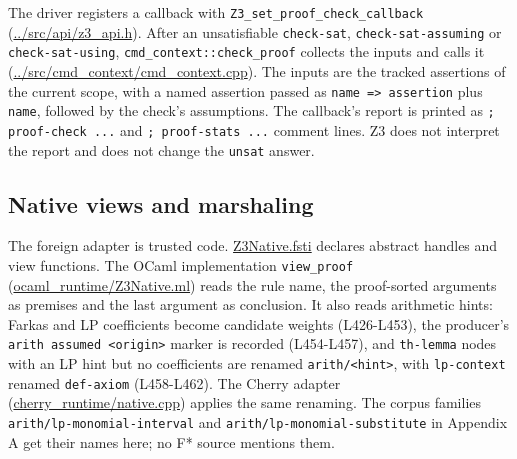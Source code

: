 \documentclass[10pt,a4paper]{article}
\begin{document}
The driver registers a callback with \texttt{Z3\_\allowbreak{}set\_\allowbreak{}proof\_\allowbreak{}check\_\allowbreak{}callback} (\href{https://github.com/Z3Prover/z3/blob/8fbb275aba0472e862e289c7af1331b3bd5d512c/src/api/z3_api.h\#L1735-L1761}{.\allowbreak{}.\allowbreak{}/\allowbreak{}src/\allowbreak{}api/\allowbreak{}z3\_\allowbreak{}api.\allowbreak{}h}). After an unsatisfiable \texttt{check-{}\allowbreak{}sat}, \texttt{check-{}\allowbreak{}sat-{}\allowbreak{}assuming} or \texttt{check-{}\allowbreak{}sat-{}\allowbreak{}using}, \texttt{cmd\_\allowbreak{}context:\allowbreak{}:\allowbreak{}check\_\allowbreak{}proof} collects the inputs and calls it (\href{https://github.com/Z3Prover/z3/blob/8fbb275aba0472e862e289c7af1331b3bd5d512c/src/cmd_context/cmd_context.cpp\#L2026-L2056}{.\allowbreak{}.\allowbreak{}/\allowbreak{}src/\allowbreak{}cmd\_\allowbreak{}context/\allowbreak{}cmd\_\allowbreak{}context.\allowbreak{}cpp}). The inputs are the tracked assertions of the current scope, with a named assertion passed as \texttt{name =\allowbreak{}> assertion} plus \texttt{name}, followed by the check's assumptions. The callback's report is printed as \texttt{; proof-{}\allowbreak{}check .\allowbreak{}.\allowbreak{}.\allowbreak{}} and \texttt{; proof-{}\allowbreak{}stats .\allowbreak{}.\allowbreak{}.\allowbreak{}} comment lines. Z3 does not interpret the report and does not change the \texttt{unsat} answer.

\subsection{Native views and marshaling}\label{sec:32-native-views-and-marshaling}

The foreign adapter is trusted code. \href{https://github.com/Z3Prover/z3/blob/8fbb275aba0472e862e289c7af1331b3bd5d512c/fstar/Z3Native.fsti}{Z3Native.\allowbreak{}fsti} declares abstract handles and view functions. The OCaml implementation \texttt{view\_\allowbreak{}proof} (\href{https://github.com/Z3Prover/z3/blob/8fbb275aba0472e862e289c7af1331b3bd5d512c/fstar/ocaml_runtime/Z3Native.ml\#L404-L501}{ocaml\_\allowbreak{}runtime/\allowbreak{}Z3Native.\allowbreak{}ml}) reads the rule name, the proof-sorted arguments as premises and the last argument as conclusion. It also reads arithmetic hints: Farkas and LP coefficients become candidate weights (L426-L453), the producer's \texttt{arith assumed <origin>} marker is recorded (L454-L457), and \texttt{th-{}\allowbreak{}lemma} nodes with an LP hint but no coefficients are renamed \texttt{arith/\allowbreak{}<hint>}, with \texttt{lp-{}\allowbreak{}context} renamed \texttt{def-{}\allowbreak{}axiom} (L458-L462). The Cherry adapter (\href{https://github.com/Z3Prover/z3/blob/8fbb275aba0472e862e289c7af1331b3bd5d512c/fstar/cherry_runtime/native.cpp\#L603-L631}{cherry\_\allowbreak{}runtime/\allowbreak{}native.\allowbreak{}cpp}) applies the same renaming. The corpus families \texttt{arith/\allowbreak{}lp-{}\allowbreak{}monomial-{}\allowbreak{}interval} and \texttt{arith/\allowbreak{}lp-{}\allowbreak{}monomial-{}\allowbreak{}substitute} in Appendix A get their names here; no F* source mentions them.
\end{document}
